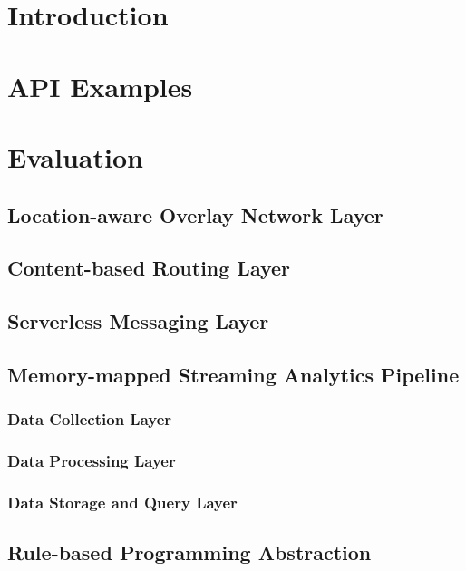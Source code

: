 \section{Introduction}

\section{API Examples}

\section{Evaluation}

\subsection{Location-aware Overlay Network Layer}

\subsection{Content-based Routing Layer}\label{sec:frameworkc}

\subsection{Serverless Messaging Layer}\label{sec:serverless}

\subsection{Memory-mapped Streaming Analytics Pipeline}

\subsubsection{Data Collection Layer}

\subsubsection{Data Processing Layer}

\subsubsection{Data Storage and Query Layer}

\subsection{Rule-based Programming Abstraction}\label{sec:programming-data}

